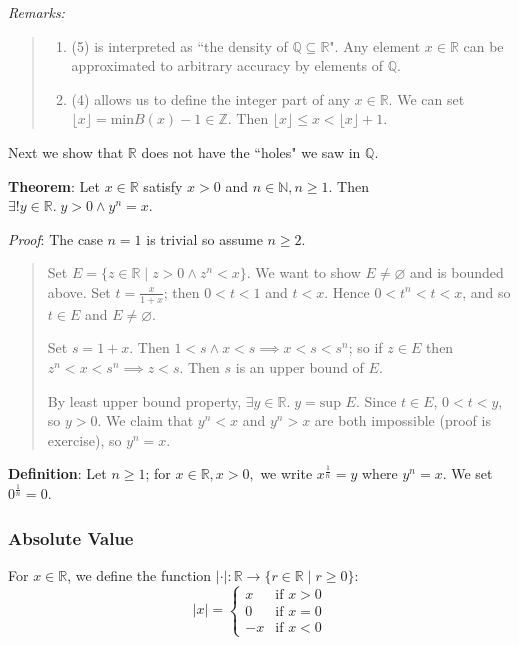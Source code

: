 \documentclass[11pt]{article}
\begin{document}
\emph{Remarks:}
\begin{quote}\vspace{-0.3cm}
	\begin{enumerate}
	\item (5) is interpreted as ``the density of $\mathbb{Q} \subseteq \mathbb{R}$". Any element $x \in \mathbb{R}$ can be approximated to arbitrary accuracy by elements of $\mathbb{Q}$.
	\item (4) allows us to define the integer part of any $x \in \mathbb{R}$. We can set $\lfloor x \rfloor = \text{min} B(x) - 1 \in \mathbb{Z}$. Then $\lfloor x \rfloor \leq x < \lfloor x \rfloor + 1$.
	\end{enumerate}
\end{quote}

Next we show that $\mathbb{R}$ does not have the ``holes" we saw in $\mathbb{Q}$.

\textbf{Theorem}: Let $x \in \mathbb{R}$ satisfy $x > 0$ and $n \in \mathbb{N}, n \geq 1$. Then $\exists ! y \in \mathbb{R}.\; y > 0 \land y^n = x$.

\emph{Proof}: The case $n = 1$ is trivial so assume $n \geq 2$.
\begin{quote}\vspace{-0.3cm}
Set $E = \{z \in \mathbb{R} \;|\; z > 0 \land z^n < x\}$. We want to show $E \neq \varnothing$ and is bounded above. Set $t = \frac{x}{1+x}$; then $0 < t < 1$ and $t < x$. Hence $0 < t^n < t < x$, and so $t \in E$ and $E \neq \varnothing$.

Set $s = 1+x$. Then $1 < s \land x < s \implies x < s < s^n$; so if $z \in E$ then $z^n < x < s^n \implies z < s$. Then $s$ is an upper bound of $E$.

By least upper bound property, $\exists y \in \mathbb{R}.\; y = \text{sup } E$. Since $t \in E$, $0 < t < y$, so $y > 0$. We claim that $y^n < x$ and $y^n > x$ are both impossible (proof is exercise), so $y^n = x$.
\end{quote}

\textbf{Definition}: Let $n \geq 1$; for $x \in \mathbb{R}, x > 0,$ we write $x^{\frac{1}{n}} = y$ where $y^n = x$. We set $0^{\frac{1}{n}} = 0$.


\subsubsection{Absolute Value}

For $x \in \mathbb{R}$, we define the function $|\cdot| : \mathbb{R} \to \{r \in \mathbb{R} \;|\; r \geq 0\}$:
\[
 |x| =
  \begin{cases}
   x & \text{if } x > 0\\
   0 & \text{if } x = 0\\
  -x & \text{if } x < 0
  \end{cases}
\]
\end{document}
